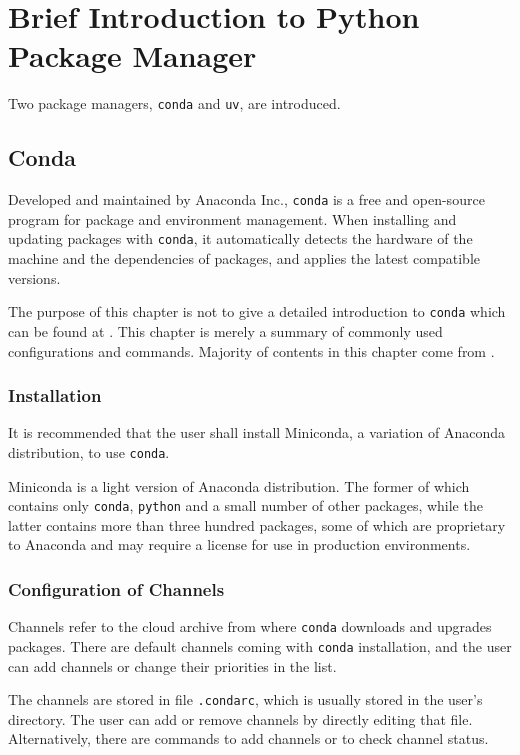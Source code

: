 \chapter{Brief Introduction to Python Package Manager}

Two package managers, \verb|conda| and \verb|uv|, are introduced.

\section{Conda}

Developed and maintained by Anaconda Inc., \verb|conda| is a free and open-source program for package and environment management. When installing and updating packages with \verb|conda|, it automatically detects the hardware of the machine and the dependencies of packages, and applies the latest compatible versions.

The purpose of this chapter is not to give a detailed introduction to \verb|conda| which can be found at \cite{conda2025}. This chapter is merely a summary of commonly used configurations and commands. Majority of contents in this chapter come from \cite{conda2025cheatsheet}.

\subsection{Installation}

It is recommended that the user shall install Miniconda, a variation of Anaconda distribution, to use \verb|conda|.

Miniconda is a light version of Anaconda distribution. The former of which contains only \verb|conda|, \verb|python| and a small number of other packages, while the latter contains more than three hundred packages, some of which are proprietary to Anaconda and may require a license for use in production environments.

\subsection{Configuration of Channels}

Channels refer to the cloud archive from where \verb|conda| downloads and upgrades packages. There are default channels coming with \verb|conda| installation, and the user can add channels or change their priorities in the list.

The channels are stored in file \verb|.condarc|, which is usually stored in the user's directory. The user can add or remove channels by directly editing that file. Alternatively, there are commands to add channels or to check channel status. 

